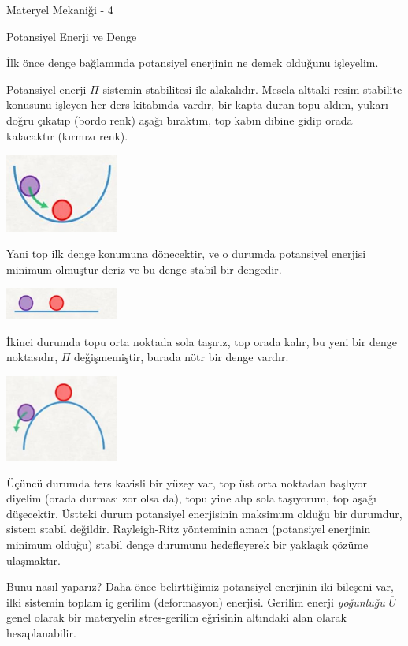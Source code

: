 \documentclass[12pt,fleqn]{article}\usepackage{../../common}
\begin{document}
Materyel Mekaniği - 4

Potansiyel Enerji ve Denge

İlk önce denge bağlamında potansiyel enerjinin ne demek olduğunu işleyelim.

Potansiyel enerji $\Pi$ sistemin stabilitesi ile alakalıdır. Mesela alttaki
resim stabilite konusunu işleyen her ders kitabında vardır, bir kapta duran topu
aldım, yukarı doğru çıkatıp (bordo renk) aşağı bıraktım, top kabın dibine gidip
orada kalacaktır (kırmızı renk). 

\includegraphics[width=10em]{phy_020_strs_04_01.jpg}

Yani top ilk denge konumuna dönecektir, ve o durumda potansiyel enerjisi minimum
olmuştur deriz ve bu denge stabil bir dengedir.

\includegraphics[width=10em]{phy_020_strs_04_02.jpg}

İkinci durumda topu orta noktada sola taşırız, top orada kalır, bu yeni
bir denge noktasıdır, $\Pi$ değişmemiştir, burada nötr bir denge vardır.

\includegraphics[width=10em]{phy_020_strs_04_03.jpg}

Üçüncü durumda ters kavisli bir yüzey var, top üst orta noktadan başlıyor
diyelim (orada durması zor olsa da), topu yine alıp sola taşıyorum, top aşağı
düşecektir. Üstteki durum potansiyel enerjisinin maksimum olduğu bir durumdur,
sistem stabil değildir. Rayleigh-Ritz yönteminin amacı (potansiyel enerjinin
minimum olduğu) stabil denge durumunu hedefleyerek bir yaklaşık çözüme
ulaşmaktır.

Bunu nasıl yaparız? Daha önce belirttiğimiz potansiyel enerjinin iki bileşeni
var, ilki sistemin toplam iç gerilim (deformasyon) enerjisi. Gerilim enerji
{\em yoğunluğu} $\overline{U}$ genel olarak bir materyelin stres-gerilim eğrisinin
altındaki alan olarak hesaplanabilir.
\end{document}

